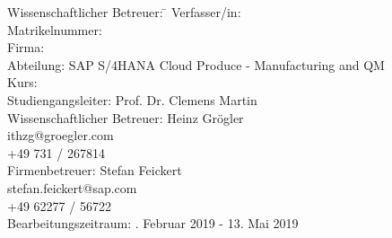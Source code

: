 \begin{titlepage}
\begin{center}
\begin{minipage}{\textwidth}
\begin{tabbing}
	Wissenschaftlicher Betreuer: \hspace{0.85cm}\=\kill
	Verfasser/in: \> \DerAutorDerArbeit \\[1.5mm]
	Matrikelnummer:  \\[1.5mm]
	Firma: \> \DerNameDerFirma  \\[1.5mm]
	Abteilung: \> SAP S/4HANA Cloud Produce - Manufacturing and QM \\[1.5mm]
	Kurs: \> \DieKursbezeichnung \\[1.5mm]
	Studiengangsleiter: \> Prof. Dr. Clemens Martin  \\[1.5mm]
	Wissenschaftlicher Betreuer: \> Heinz Grögler \\
	\> ithzg@groegler.com \\
	\> +49 731 / 267814 \\[1.5mm]
	Firmenbetreuer: \> Stefan Feickert \\
	\> stefan.feickert@sap.com \\
	\> +49 62277 / 56722 \\[1.5mm]
	Bearbeitungszeitraum: . Februar 2019 - 13. Mai 2019
\end{tabbing}
\end{minipage}

\end{center}

\end{titlepage}